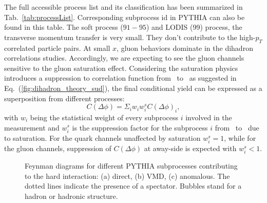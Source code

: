 The full accessible process list and its classification has been summarized in
Tab.~\ref{tab:processList}. Corresponding subprocess id in PYTHIA can also be found in this table. The soft process ($91-95$) and LODIS (99)
process, the transverse momentum transfer is very small. They don't contribute
to the high-$p_{T}$ correlated particle pairs. At small $x$, gluon behaviors
dominate in the dihadron correlations studies. Accordingly, we are expecting to
see the gluon channels sensitive to the gluon saturation effect. Considering the
saturation physics introduces a suppression to correlation function from \ep\ to
\eA\ as suggested in Eq.~(\ref{fig:dihadron_theory_sud}), the final conditional
yield can be expressed as a superposition from different processes:
\begin{equation} 
C(\Delta\phi)=\Sigma_{i}w_{i}w^{s}_{i}C(\Delta\phi)_{i},
\label{eqn:subprocess} 
\end{equation}
with $w_{i}$ being the statistical weight of every subprocess $i$ involved in
the measurement and $w^{s}_{i}$ is the suppression factor for the subprocess $i$
from \ep\ to \eA\ due to saturation. For the quark channels unaffected by saturation $w^{s}_{i}=1$,
while for the gluon channels, suppression of $C(\Delta\phi)$ at away-side is
expected with $w^{s}_{i}<1$.

\begin{figure} 
\begin{center} 
\quad 
{} 
\quad
{}
\caption[PYTIHIA subprocess categories]{Feynman diagrams for different
PYTHIA subprocesses contributing to the hard interaction: (a) direct, (b) VMD,
(c) anomalous. The dotted lines indicate the presence of a spectator. Bubbles
stand for a hadron or hadronic structure.}
\label{fig:PYTHIAFeyn} 
\end{center} 
\end{figure}


